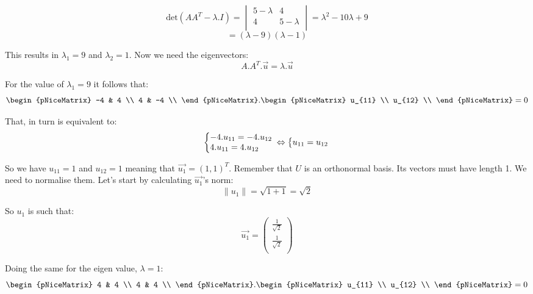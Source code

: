\documentclass[a4,12pt,twosided,openany]{memoir}
\begin{document}
\[\textrm{det}(AA^T-\lambda.I) = \begin{vmatrix}
5- \lambda & 4\\
4 & 5-\lambda \\
\end{vmatrix} = \lambda^2 -10\lambda + 9
\]
\[ = (\lambda -9)(\lambda - 1)\]
\par 
\indent
This results in $\lambda_1 = 9$ and $\lambda_2 = 1$. Now we need the eigenvectors:
\[A.A^T.\overrightarrow{u} = \lambda .\overrightarrow{u} \]
\par 
\indent
For the value of $\lambda_1 = 9$ it follows that:
\[\begin{pNiceMatrix} 
-4 & 4 \\
4 & -4 \\
\end{pNiceMatrix} . \begin{pNiceMatrix} 
u_{11} \\
u_{12} \\
\end{pNiceMatrix} = 0
\]
\par 
\indent
That, in turn is equivalent to:
\[
  \left\{\begin{array}{@{}l@{}}
   -4.u_{11} = -4.u_{12}\\
   4.u_{11} = 4.u_{12}
  \end{array}\right.\, 
  \Leftrightarrow
  \left\{\begin{array}{@{}l@{}}
   u_{11} = u_{12}
  \end{array}\right.\,
\]
\par 
\indent
So we have $u_{11} = 1$ and $u_{12} = 1$ meaning that $\overrightarrow{u_1} = (1,1)^T$.
Remember that $U$ is an orthonormal basis. Its vectors must have length 1. We need to normalise them. Let's start by calculating $\overrightarrow{u_1}$'s norm:
\[\| u_1 \| = \sqrt{1 + 1} = \sqrt{2}\]
\par 
\indent
So $u_1$ is such that:
\[\overrightarrow{u_1} = \begin{pmatrix}
\frac{1}{\sqrt{2}}\\
\frac{1}{\sqrt{2}}\\
\end{pmatrix}
\]
\par 
\indent
Doing the same for the eigen value, $\lambda = 1$:
\[
\begin{pNiceMatrix} 
4 & 4 \\
4 & 4 \\
\end{pNiceMatrix} . \begin{pNiceMatrix} 
u_{11} \\
u_{12} \\
\end{pNiceMatrix} = 0
\]
\end{document}

